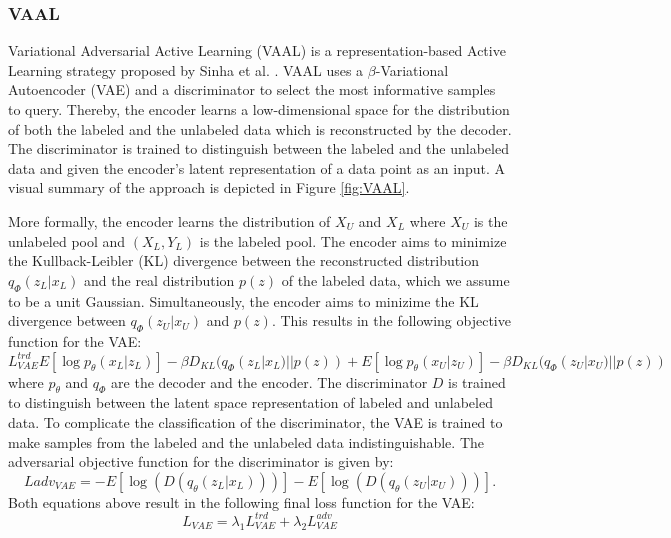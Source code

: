 \subsubsection{VAAL}
Variational Adversarial Active Learning (VAAL) is a representation-based Active Learning strategy proposed by Sinha et al. \cite{sinha2019variational}. VAAL uses a $\beta$-Variational Autoencoder
(VAE) \cite{higgins2017beta} and a discriminator to select the most informative samples to query. Thereby, the encoder learns a low-dimensional space for the distribution of both the labeled and the 
unlabeled data which is reconstructed by the decoder. The discriminator is trained to distinguish between the labeled and the unlabeled data and given the encoder's latent representation of a data point
as an input. A visual summary of the approach is depicted in Figure \ref{fig:VAAL}. \par
More formally, the encoder learns the distribution of $X_U$ and $X_L$ where $X_U$ is the unlabeled pool and $(X_L,Y_L)$ is the labeled pool. The encoder aims to minimize the Kullback-Leibler (KL) divergence
\cite{goldberger2004hierarchical} between the reconstructed distribution $q_\Phi (z_L | x_L)$ and the real distribution $p(z)$ of the labeled data, which we assume to be a unit Gaussian. Simultaneously, the 
encoder aims to minizime the KL divergence between $q_\Phi (z_U | x_U)$ and $p(z)$. This results in the following objective function for the VAE:
\begin{equation}
    L^{trd}_{VAE} E[\log p_\theta (x_L | z_L)] - \beta D_{KL} (q_\Phi (z_L | x_L) || p(z)) + E[\log p_\theta (x_U | z_U)] - \beta D_{KL} (q_\Phi (z_U | x_U) || p(z))
\end{equation}
where $p_\theta$ and $q_\Phi$ are the decoder and the encoder. The discriminator $D$ is trained to distinguish between the latent space representation of labeled and unlabeled data. To complicate the 
classification of the discriminator, the VAE is trained to make samples from the labeled and the unlabeled data indistinguishable. The adversarial objective function for the discriminator is given by:
\begin{equation}
    L{adv}_{VAE} = - E[\log(D(q_\theta (z_L | x_L)))] - E[\log(D(q_\theta(z_U | x_U)))].
\end{equation}
Both equations above result in the following final loss function for the VAE:
\begin{equation}
    L_{VAE} = \lambda_1 L^{trd}_{VAE} + \lambda_2 L^{adv}_{VAE}
\end{equation}
